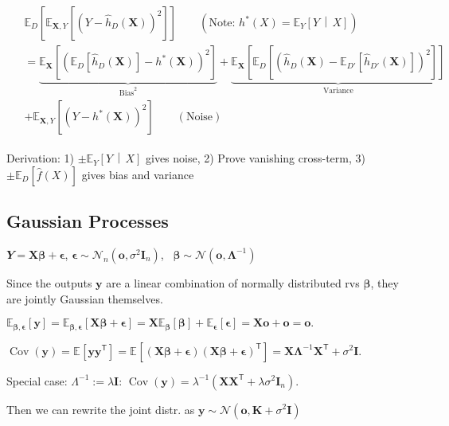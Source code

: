 \documentclass[a4paper,10pt,twoside]{extarticle}
\newcommand{\cN}{\mathcal{N}}
\newcommand{\Exp}[2][]{{\mathbb{E}_{#1}}\left[ #2
\right]}
\newcommand{\cExp}[3][]{{\mathbb{E}}_{#1}\left[ #2
\,\middle|\, #3 \right]}
\newcommand{\Cov}[1]{\operatorname{Cov}\left(#1 \right)}
\newcommand{\rvY}{\mathbfit{Y}}
\newcommand*{\T}{\mathsf{T}}
\newcommand{\mat}[1]{\mathbf{#1}}
\renewcommand{\vec}[1]{\mathbf{#1}}
\newcommand{\vo}{\vec{o}}
\newcommand{\vy}{\vec{y}}
\newcommand{\vbeta}{\boldsymbol{\beta}}
\newcommand{\vepsilon}{\boldsymbol{\epsilon}}
\newcommand{\MI}{\mat{I}}
\newcommand{\MK}{\mat{K}}
\newcommand{\MX}{\mat{X}}
\newcommand{\MLambda}{\mat{\Lambda}}
\begin{document}
\begin{landscape}
\begin{multicols*}{3}
\begin{gather*}
\begin{flalign*}
&\Exp[D]{
 \Exp[\MX,Y]{(Y-\hat{h}_D(\MX))^2}
}
\qquad\left(\text{Note: }h^*(X)=\cExp[Y]{Y}{X}\right)
\\
&
=
\underbrace{
\Exp[\MX]{
\left(
\Exp[D]{\hat{h}_D(\MX)}-
h^*(\MX)
\right)^2}
}_{\text{Bias}^2}
+
\underbrace{
\Exp[\MX]{
\Exp[D]{\left(\hat{h}_D(\MX)-\Exp[D']{\hat{h}_{D'}(\MX)}\right)^2}}
}_{\text{Variance}}
\\
&+\Exp[\MX,Y]{\left(Y-h^*(\MX)\right)^2}
\qquad
\left(\text{Noise}\right)
\end{flalign*}
\end{gather*}

Derivation: 1) $\pm\cExp[Y]{Y}{X}$ gives noise, 2) Prove vanishing cross-term,
3) $\pm\Exp[D]{\hat{f}(X)}$ gives bias and variance

\subsection{Gaussian Processes}

$\rvY=\MX\vbeta+\vepsilon$, $\vepsilon\sim\cN_n(\vo,\sigma^2\MI_n)$,
\,
$\vbeta\sim\cN(\vo,\MLambda^{-1})$

Since the outputs $\vy$ are a linear combination of normally distributed rvs
$\vbeta$, they are jointly Gaussian themselves.

$
\Exp[\vbeta,\vepsilon]{\vy}
=
\Exp[\vbeta,\vepsilon]{\MX\vbeta+\vepsilon}
=
\MX\Exp[\vbeta]{\vbeta}
+\Exp[\vepsilon]{\vepsilon}
=
\MX\vo
+
\vo
=
\vo.
$

$\Cov{\vy}
=\Exp{\vy\vy^\T}
=\Exp{(\MX\vbeta+\vepsilon)(\MX\vbeta+\vepsilon)^\T}
=\MX\MLambda^{-1}\MX^\T+\sigma^2\MI.$

Special case: $\Lambda^{-1}:=\lambda\MI$:
$\Cov{\vy}=\lambda^{-1}(\MX\MX^\T+\lambda\sigma^2\MI_n)$.

Then we can rewrite the joint distr. as $\vy\sim\cN(\vo,\MK+\sigma^2\MI)$

\begin{comment}
$
\begin{pmatrix}
y_1\\
y_2\\
\vdots\\
y_n
\end{pmatrix}
\sim
\cN
\left(
\begin{pmatrix}
0\\
0\\
\vdots\\
0
\end{pmatrix},
\begin{pmatrix}
k_{1,1} + \sigma^2 & k_{1,2} & \cdots & k_{1,n}\\
k_{2,1} & k_{2,2} + \sigma^2 & \cdots & k_{2,n}\\
\vdots & \vdots & \ddots & \vdots\\
k_{n,1} & k_{n,2} & \cdots & k_{n,n}+ \sigma^2\\
\end{pmatrix}
\right),
$
\end{comment}


\end{multicols*}
\end{landscape}
\end{document}
